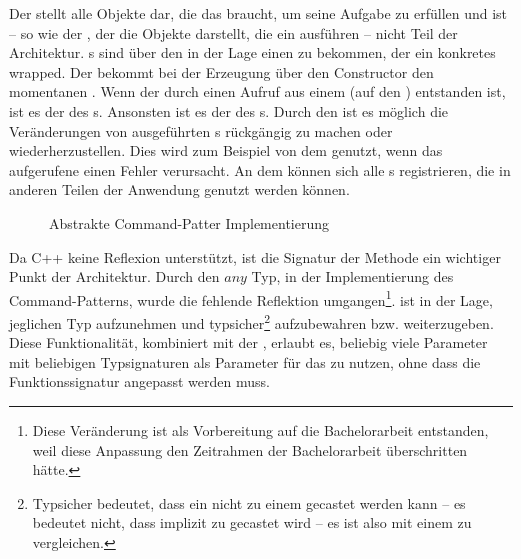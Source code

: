       Der  stellt alle Objekte dar, die das  braucht, um seine Aufgabe zu erfüllen und ist -- so wie der , der die Objekte darstellt, die ein  ausführen -- nicht Teil der Architektur. s sind über den  in der Lage einen  zu bekommen, der ein konkretes  wrapped. Der  bekommt bei der Erzeugung über den Constructor den momentanen . Wenn der  durch einen Aufruf aus einem  (auf den ) entstanden ist, ist es der  des s. Ansonsten ist es der  des s. Durch den  ist es möglich die Veränderungen von ausgeführten s rückgängig zu machen oder wiederherzustellen. Dies wird zum Beispiel von dem  genutzt, wenn das aufgerufene  einen Fehler verursacht. An dem  können sich alle s registrieren, die in anderen Teilen der Anwendung genutzt werden können.

      \begin{figure}[H]
        \centering
        \caption{Abstrakte Command-Patter Implementierung}
        \label{fig:commanduml}
      \end{figure}

      Da C++ keine Reflexion \autocites{vinoski2005time}{ferber1989computational} unterstützt, ist die Signatur der  Methode ein wichtiger Punkt der Architektur. Durch den \myTIn$any$ \autocite{cpp-fundamentals} Typ, in der Implementierung des Command-Patterns, wurde die fehlende Reflektion umgangen\footnote{
         Diese Veränderung ist als Vorbereitung auf die Bachelorarbeit entstanden, weil diese Anpassung den Zeitrahmen der Bachelorarbeit überschritten hätte.
      }.  ist in der Lage, jeglichen Typ aufzunehmen und typsicher\footnote{
        Typsicher bedeutet, dass ein  nicht zu einem  gecastet werden kann -- es bedeutet nicht, dass  implizit zu  gecastet wird -- es ist also mit einem  zu vergleichen.
      } aufzubewahren bzw. weiterzugeben. Diese Funktionalität, kombiniert mit der , erlaubt es, beliebig viele Parameter mit beliebigen Typsignaturen als Parameter für das  zu nutzen, ohne dass die Funktionssignatur angepasst werden muss.

